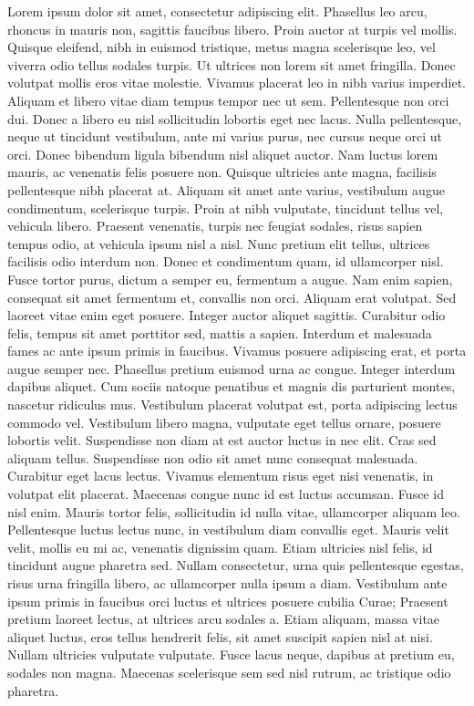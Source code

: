 \documentclass{article}
\begin{document}
\pend
\pstart
Lorem ipsum dolor sit amet, consectetur adipiscing elit. Phasellus leo arcu, rhoncus in mauris non, sagittis faucibus libero. Proin auctor at turpis vel mollis. Quisque eleifend, nibh in euismod tristique, metus magna scelerisque leo, vel viverra odio tellus sodales turpis. Ut ultrices non lorem sit amet fringilla. Donec volutpat mollis eros vitae molestie. Vivamus placerat leo in nibh varius imperdiet. Aliquam et libero vitae diam tempus tempor nec ut sem.
\pend
\pstart
Pellentesque non orci dui. Donec a libero eu nisl sollicitudin lobortis eget nec lacus. Nulla pellentesque, neque ut tincidunt vestibulum, ante mi varius purus, nec cursus neque orci ut orci. Donec bibendum ligula bibendum nisl aliquet auctor. Nam luctus lorem mauris, ac venenatis felis posuere non. Quisque ultricies ante magna, facilisis pellentesque nibh placerat at. Aliquam sit amet ante varius, vestibulum augue condimentum, scelerisque turpis. Proin at nibh vulputate, tincidunt tellus vel, vehicula libero. Praesent venenatis, turpis nec feugiat sodales, risus sapien tempus odio, at vehicula ipsum nisl a nisl. Nunc pretium elit tellus, ultrices facilisis odio interdum non. Donec et condimentum quam, id ullamcorper nisl.
\pend
\pstart
Fusce tortor purus, dictum a semper eu, fermentum a augue. Nam enim sapien, consequat sit amet fermentum et, convallis non orci. Aliquam erat volutpat. Sed laoreet vitae enim eget posuere. Integer auctor aliquet sagittis. Curabitur odio felis, tempus sit amet porttitor sed, mattis a sapien. Interdum et malesuada fames ac ante ipsum primis in faucibus. Vivamus posuere adipiscing erat, et porta augue semper nec.
\pend
\pstart
Phasellus pretium euismod urna ac congue. Integer interdum dapibus aliquet. Cum sociis natoque penatibus et magnis dis parturient montes, nascetur ridiculus mus. Vestibulum placerat volutpat est, porta adipiscing lectus commodo vel. Vestibulum libero magna, vulputate eget tellus ornare, posuere lobortis velit. Suspendisse non diam at est auctor luctus in nec elit. Cras sed aliquam tellus. Suspendisse non odio sit amet nunc consequat malesuada. Curabitur eget lacus lectus. Vivamus elementum risus eget nisi venenatis, in volutpat elit placerat. Maecenas congue nunc id est luctus accumsan. Fusce id nisl enim.
\pend
\pstart
Mauris tortor felis, sollicitudin id nulla vitae, ullamcorper aliquam leo. Pellentesque luctus lectus nunc, in vestibulum diam convallis eget. Mauris velit velit, mollis eu mi ac, venenatis dignissim quam. Etiam ultricies nisl felis, id tincidunt augue pharetra sed. Nullam consectetur, urna quis pellentesque egestas, risus urna fringilla libero, ac ullamcorper nulla ipsum a diam. Vestibulum ante ipsum primis in faucibus orci luctus et ultrices posuere cubilia Curae; Praesent pretium laoreet lectus, at ultrices arcu sodales a. Etiam aliquam, massa vitae aliquet luctus, eros tellus hendrerit felis, sit amet suscipit sapien nisl at nisi. Nullam ultricies vulputate vulputate. Fusce lacus neque, dapibus at pretium eu, sodales non magna. Maecenas scelerisque sem sed nisl rutrum, ac tristique odio pharetra.
\end{document}
